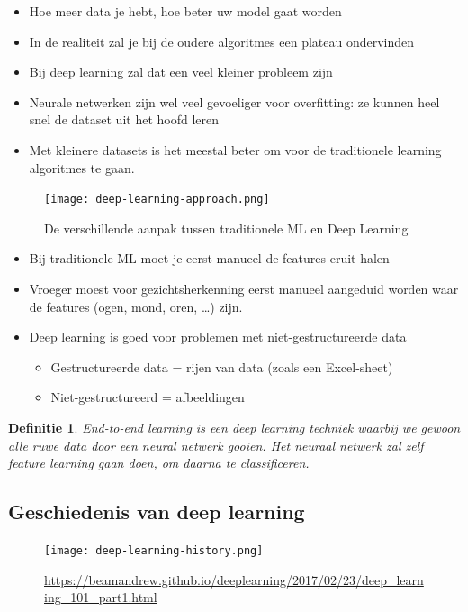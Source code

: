 \documentclass{article}
\newtheorem{theorem}{Definitie}[section]
\begin{document}
\begin{itemize}
    \item Hoe meer data je hebt, hoe beter uw model gaat worden
    \item In de realiteit zal je bij de oudere algoritmes een plateau ondervinden
    \item Bij deep learning zal dat een veel kleiner probleem zijn
    \item Neurale netwerken zijn wel veel gevoeliger voor overfitting: ze kunnen heel snel de dataset uit het hoofd leren
    \item Met kleinere datasets is het meestal beter om voor de traditionele learning algoritmes te gaan.
\end{itemize}

\begin{figure}[H]
    \centering
    \texttt{[image: deep-learning-approach.png]}
    \caption{De verschillende aanpak tussen traditionele ML en Deep Learning}
\end{figure}

\begin{itemize}
    \item Bij traditionele ML moet je eerst manueel de features eruit halen
    \item Vroeger moest voor gezichtsherkenning eerst manueel aangeduid worden waar de features (ogen, mond, oren, \dots) zijn.
    \item Deep learning is goed voor problemen met niet-gestructureerde data
    \begin{itemize}
        \item Gestructureerde data = rijen van data (zoals een Excel-sheet)
        \item Niet-gestructureerd = afbeeldingen
    \end{itemize}
\end{itemize}

\begin{theorem}
    End-to-end learning is een deep learning techniek waarbij we gewoon alle ruwe data door een neural netwerk
    gooien. Het neuraal netwerk zal zelf feature learning gaan doen, om daarna te classificeren.
\end{theorem}

\subsection{Geschiedenis van deep learning}

\begin{figure}[H]
    \centering
    \texttt{[image: deep-learning-history.png]}
    \caption{\url{https://beamandrew.github.io/deeplearning/2017/02/23/deep_learning_101_part1.html}}
\end{figure}
\end{document}
